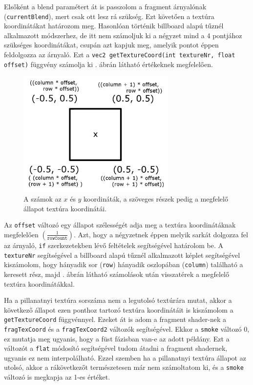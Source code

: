 Elsőként a blend paramétert át is passzolom a fragment árnyalónak (\texttt{currentBlend}), mert csak ott lesz rá szükség. Ezt követően a textúra koordinátákat határozom meg. Hasonlóan történik billboard alapú tűznél alkalmazott módszerhez, de itt nem számoljuk ki a négyzet mind a 4 pontjához szükséges koordinátákat, csupán azt kapjuk meg, amelyik pontot éppen feldolgozza az árnyaló. Ezt a \texttt{vec2 getTextureCoord(int textureNr, float offset)} függvény számolja ki . ábrán látható értékeknek megfelelően.

\begin{figure}[h]
 \centering
 \includegraphics[width=0.7\textwidth]{kepek/particleBillboard.png}
 \caption{A számok az $x$ és $y$ koordináták, a szöveges részek pedig a megfelelő állapot textúra koordinátái.}
 \label{fig:particleBillboard}
\end{figure}

Az \texttt{offset} változó egy állapot szélességét adja meg a textúra koordinátáknak megfelelően $(\frac{1}{\texttt{rowCount}})$. Azt, hogy a négyzetnek éppen melyik sarkát dolgozza fel az árnyaló, \texttt{if} szerkezetekben lévő feltételek segítségével határolom be. A \texttt{textureNr} segítségével a billboard alapú tűznél alkalmazott képlet segítségével kiszámolom, hogy hányadik sor (\texttt{row}) hányadik oszlopában (\texttt{column}) található a keresett rész, majd . ábrán látható számolások után visszatérek a megfelelő textúra koordinátákkal.

Ha a pillanatnyi textúra sorszáma nem a legutolsó textúrára mutat, akkor a következő állapot ezen ponthoz tartozó textúra koordinátáit is kiszámolom a \texttt{getTextureCoord} függvénnyel. Ezeket át is adom a fragment shader-nek a \texttt{fragTexCoord} és a \texttt{fragTexCoord2} változók segítségével. Ekkor a \texttt{smoke} változó 0, ez mutatja meg ugyanis, hogy a füst fázisban van-e az adott példány. Ezt a változót a \texttt{flat} módosító segítségével tudom átadni a fragment shadernek, ugyanis ez nem interpolálható. Ezzel szemben ha a pillanatnyi textúra állapot az utolsó, akkor a rákövetkezőt természetesen már nem számoltatom ki, és a \texttt{smoke} változó is megkapja az 1-es értéket.

